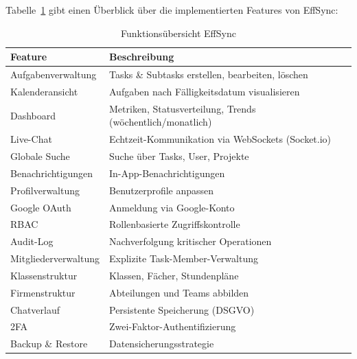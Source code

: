 
Tabelle~\ref{tab:features} gibt einen Überblick über die implementierten
Features von EffSync:

\begin{table}[H]
    \centering
    \caption{Funktionsübersicht EffSync}
    \begin{tabularx}{\textwidth}{lX}
        \toprule
        \textbf{Feature} & \textbf{Beschreibung} \\
        \midrule
        Aufgabenverwaltung   & Tasks \& Subtasks erstellen, bearbeiten, löschen \\
        Kalenderansicht      & Aufgaben nach Fälligkeitsdatum visualisieren \\
        Dashboard            & Metriken, Statusverteilung, Trends (wöchentlich/monatlich) \\
        Live-Chat            & Echtzeit-Kommunikation via WebSockets (Socket.io) \\
        Globale Suche        & Suche über Tasks, User, Projekte \\
        Benachrichtigungen   & In-App-Benachrichtigungen \\
        Profilverwaltung     & Benutzerprofile anpassen \\
        Google OAuth         & Anmeldung via Google-Konto \\
        RBAC                 & Rollenbasierte Zugriffskontrolle \\
        Audit-Log            & Nachverfolgung kritischer Operationen \\
        Mitgliederverwaltung & Explizite Task-Member-Verwaltung \\
        Klassenstruktur      & Klassen, Fächer, Stundenpläne \\
        Firmenstruktur       & Abteilungen und Teams abbilden \\
        Chatverlauf          & Persistente Speicherung (DSGVO) \\
        2FA                  & Zwei-Faktor-Authentifizierung \\
        Backup \& Restore    & Datensicherungsstrategie \\
        \bottomrule
    \end{tabularx}
    \label{tab:features}
\end{table}

\label{sec:wbs}

